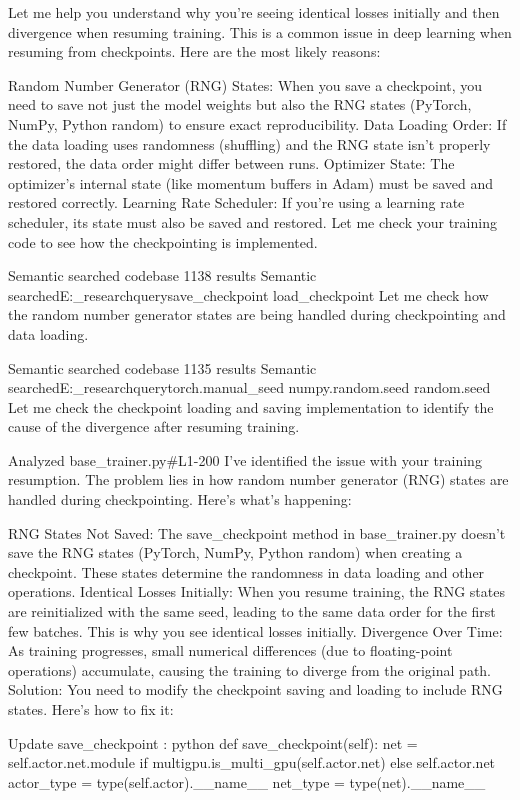 Let me help you understand why you're seeing identical losses initially and then divergence when resuming training. This is a common issue in deep learning when resuming from checkpoints. Here are the most likely reasons:

Random Number Generator (RNG) States: When you save a checkpoint, you need to save not just the model weights but also the RNG states (PyTorch, NumPy, Python random) to ensure exact reproducibility.
Data Loading Order: If the data loading uses randomness (shuffling) and the RNG state isn't properly restored, the data order might differ between runs.
Optimizer State: The optimizer's internal state (like momentum buffers in Adam) must be saved and restored correctly.
Learning Rate Scheduler: If you're using a learning rate scheduler, its state must also be saved and restored.
Let me check your training code to see how the checkpointing is implemented.

Semantic searched codebase
1138 results
Semantic searchedE:\current_research\dsa\lib\trainwith querysave_checkpoint load_checkpoint
Let me check how the random number generator states are being handled during checkpointing and data loading.

Semantic searched codebase
1135 results
Semantic searchedE:\current_research\dsa\lib\trainwith querytorch.manual_seed numpy.random.seed random.seed
Let me check the checkpoint loading and saving implementation to identify the cause of the divergence after resuming training.

Analyzed
base_trainer.py#L1-200
I've identified the issue with your training resumption. The problem lies in how random number generator (RNG) states are handled during checkpointing. Here's what's happening:

RNG States Not Saved: The 
save_checkpoint
 method in 
base_trainer.py
 doesn't save the RNG states (PyTorch, NumPy, Python random) when creating a checkpoint. These states determine the randomness in data loading and other operations.
Identical Losses Initially: When you resume training, the RNG states are reinitialized with the same seed, leading to the same data order for the first few batches. This is why you see identical losses initially.
Divergence Over Time: As training progresses, small numerical differences (due to floating-point operations) accumulate, causing the training to diverge from the original path.
Solution:
You need to modify the checkpoint saving and loading to include RNG states. Here's how to fix it:

Update 
save_checkpoint
:
python
def save_checkpoint(self):
    net = self.actor.net.module if multigpu.is_multi_gpu(self.actor.net) else self.actor.net
    actor_type = type(self.actor).__name__
    net_type = type(net).__name__
    
